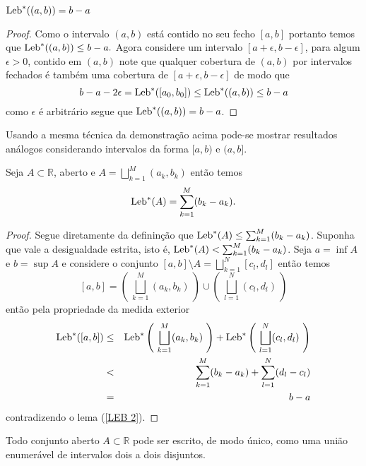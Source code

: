 \begin{lema}

$\textnormal{Leb}^{*}((a,b))=b-a$
\end{lema}


\begin{proof}
Como o intervalo $(a,b)$ está contido no seu 
fecho $[a,b]$ portanto temos que  $\textnormal{Leb}^{*}((a,b))\leq b-a.$ 
Agora considere um intervalo $[a+\epsilon,b-\epsilon]$,
para algum $\epsilon>0$, 
contido em $(a,b)$ note que qualquer cobertura de 
$(a,b)$ por intervalos fechados é também uma cobertura 
de $[a+\epsilon,b-\epsilon]$ de modo que 
$$
b-a-2\epsilon= \textnormal{Leb}^{*}([a_0,b_0])\leq  \textnormal{Leb}^{*}((a,b))\leq b-a
$$
como $\epsilon$ é arbitrário segue que  $\textnormal{Leb}^{*}((a,b))=b-a$.
\end{proof}
Usando a mesma técnica da demonstração acima pode-se mostrar 
resultados análogos considerando intervalos  
da forma $[a,b)$ e $(a,b]$.





\begin{lema}\label{LEB 3}
Seja $A\subset \mathbb{R}$,  aberto e $A=\bigsqcup_{k=1}^M(a_k,b_k)$ então temos 
$$
\textnormal{Leb}^{*}(A)=\sum_{k=1}^M(b_k-a_k).
$$
\end{lema}

\begin{proof}
Segue diretamente da defininção que 
$\textnormal{Leb}^{*}(A)\leq\sum_{k=1}^M(b_k-a_k)$. 
Suponha que vale a desigualdade estrita, 
isto é, $\textnormal{Leb}^{*}(A)<\sum_{k=1}^M(b_k-a_k)$. 
Seja $a=\inf A$ e $b=\sup A$
e considere o conjunto $[a,b]\setminus A=\bigsqcup_{k=1}^{N}[c_l,d_l]$ 
então temos
$$
[a,b]=\left(~\bigsqcup_{k=1}^M(a_k,b_k)~\right)
\cup \left(~\bigsqcup_{l=1}^{N}(c_l,d_l)~\right)
$$
então pela propriedade da medida exterior 
\begin{eqnarray*}
\textnormal{Leb}^{*}([a,b])
&\leq &
\textnormal{Leb}^*\left(~\bigsqcup_{k=1}^M(a_k,b_k)~\right)
+\textnormal{Leb}^*\left(~\bigsqcup_{l=1}^{N}(c_l,d_l)~\right)
\\
&
<
&
\sum_{k=1}^{M} (b_k-a_k)+\sum_{l=1}^N(d_l-c_l)
\\
&
=
&
b-a
\end{eqnarray*}
contradizendo o lema (\ref{LEB 2}).

\end{proof}



\begin{proposicao}
Todo conjunto aberto $A\subset \mathbb{R}$ pode ser 
escrito, de modo único, como uma união enumerável de 
intervalos dois a dois disjuntos.
\end{proposicao}



